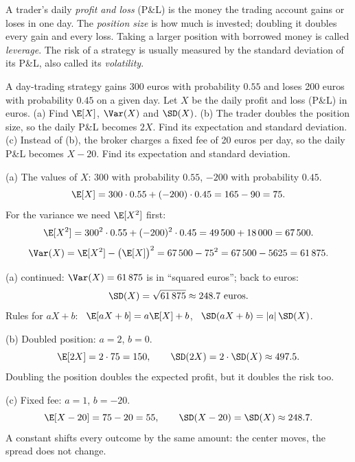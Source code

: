 
\begin{problem}
	\begin{context}
		A trader's daily \emph{profit and loss} (P\&L) is the money the trading
		account gains or loses in one day. The \emph{position size} is how much
		is invested; doubling it doubles every gain and every loss. Taking a
		larger position with borrowed money is called \emph{leverage}. The risk of a strategy is usually measured by
		the standard deviation of its P\&L, also called its \emph{volatility}.
	\end{context}
	A day-trading strategy gains 300 euros with probability $0.55$ and loses
	200 euros with probability $0.45$ on a given day. Let $X$ be the daily
	profit and loss (P\&L) in euros.
	(a) Find $\E[X]$, $\Var(X)$ and $\SD(X)$.
	(b) The trader doubles the position size, so the daily P\&L becomes $2X$.
	Find its expectation and standard deviation.
	(c) Instead of (b), the broker charges a fixed fee of 20 euros per day, so
	the daily P\&L becomes $X-20$. Find its expectation and standard deviation.
\end{problem}

\begin{slides}
	\small
	\exstatement
	\pause
	\sol (a) The values of $X$: $300$ with probability $0.55$, $-200$ with
	probability $0.45$.
	\pause
	\[ \E[X]=300\cdot0.55+(-200)\cdot0.45=165-90=75. \]
	\pause
	For the variance we need $\E[X^2]$ first:
	\[ \E[X^2]=300^2\cdot0.55+(-200)^2\cdot0.45=49\,500+18\,000=67\,500. \]
	\pause
	\[ \Var(X)=\E[X^2]-\big(\E[X]\big)^2=67\,500-75^2=67\,500-5625=61\,875. \]
\end{slides}

\begin{slides}
	\small
	(a) continued: $\Var(X)=61\,875$ is in ``squared euros''; back to euros:
	\[ \SD(X)=\sqrt{61\,875}\approx248.7\text{ euros}. \]
	\pause
	Rules for $aX+b$: \ $\E[aX+b]=a\E[X]+b$, \ $\SD(aX+b)=|a|\,\SD(X)$.
	\pause
	\medskip

	(b) Doubled position: $a=2$, $b=0$.
	\[ \E[2X]=2\cdot75=150,\qquad \SD(2X)=2\cdot\SD(X)\approx497.5. \]
	\pause
	Doubling the position doubles the expected profit, but it doubles the
	risk too.
	\pause
	\medskip

	(c) Fixed fee: $a=1$, $b=-20$.
	\[ \E[X-20]=75-20=55,\qquad \SD(X-20)=\SD(X)\approx248.7. \]
	\pause
	A constant shifts every outcome by the same amount: the center moves, the
	spread does not change.
\end{slides}

